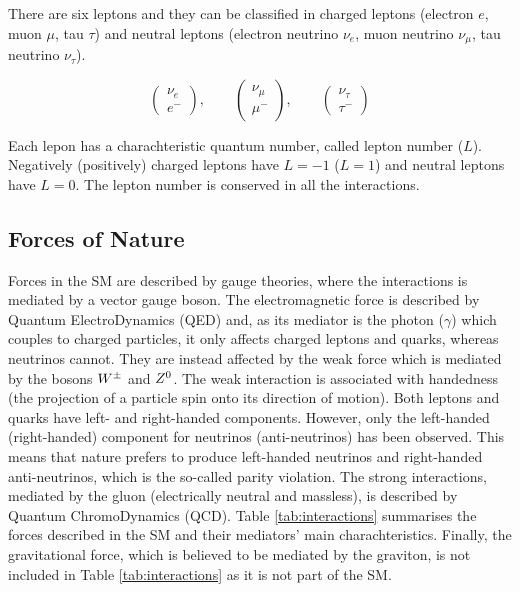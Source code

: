 				There are six leptons and they can be classified in charged leptons (electron $e$, muon $\mu$, tau $\tau$) and neutral leptons (electron neutrino $\nu_e$, muon neutrino $\nu_{\mu}$, tau neutrino $\nu_{\tau}$).

				
				\begin{equation*}
				\label{eqn:lepton_flavor_doublets}
					\begin{pmatrix} \nu_e      \\ e^-    \end{pmatrix}, \qquad
					\begin{pmatrix} \nu_{\mu}  \\ \mu^-  \end{pmatrix}, \qquad
					\begin{pmatrix} \nu_{\tau} \\ \tau^- \end{pmatrix}
				\end{equation*}

				\noindent Each lepon has a charachteristic quantum number, called lepton number ($L$). Negatively (positively) charged leptons have $L=-1$ ($L=1$) and neutral leptons have $L=0$. The lepton number is conserved in all the interactions. 



			\subsection*{Forces of Nature}

				Forces in the SM are described by gauge theories, where the interactions is mediated by a vector gauge boson. The electromagnetic force is described by Quantum ElectroDynamics (QED) and, as its mediator is the photon ($\gamma$) which couples to charged particles, it only affects charged leptons and quarks, whereas neutrinos cannot. They are instead affected by the weak force which is mediated by the bosons $W^{\pm}$ and $Z^0$. The weak interaction is associated with handedness (the projection of a particle spin onto its direction of motion). Both leptons and quarks have left- and right-handed components. However, only the left-handed (right-handed) component for neutrinos (anti-neutrinos) has been observed. This means that nature prefers to produce left-handed neutrinos and right-handed anti-neutrinos, which is the so-called parity violation. The strong interactions, mediated by the gluon (electrically neutral and massless), is described by Quantum ChromoDynamics (QCD). Table \ref{tab:interactions} summarises the forces described in the SM and their mediators' main charachteristics. Finally, the gravitational force, which is believed to be mediated by the graviton, is not included in Table \ref{tab:interactions} as it is not part of the SM.

